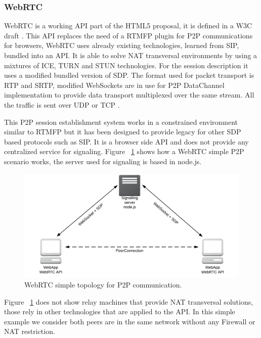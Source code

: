 \subsubsection{WebRTC}

WebRTC is a working API part of the HTML5 proposal, it is defined in a W3C draft \cite{webrtcW3cgroup}. This API replaces the need of a RTMFP plugin for P2P communications for browsers, WebRTC uses already existing technologies, learned from SIP, bundled into an API. It is able to solve NAT transversal environments by using a mixtures of ICE, TURN and STUN technologies. For the session description it uses a modified bundled version of SDP. The format used for packet transport is RTP and SRTP, modified WebSockets are in use for P2P DataChannel implementation to provide data transport multiplexed over the same stream. All the traffic is sent over UDP or TCP \cite{alvestrandOverview2012}.

This P2P session establishment system works in a constrained environment similar to RTMFP but it has been designed to provide legacy for other SDP based protocols such as SIP. It is a browser side API and does not provide any centralized service for signaling. Figure ~\ref{fig:webrtcExample} shows how a WebRTC simple P2P scenario works, the server used for signaling is based in node.js.

 \begin{figure}[h]
  \centering
    \includegraphics[width=1\textwidth]{./figures/webrtcExample.png}
      \caption[WebRTC simple topology for P2P communication]{WebRTC simple topology for P2P communication.}
	\label{fig:webrtcExample}
\end{figure}

Figure ~\ref{fig:webrtcExample} does not show relay machines that provide NAT transversal solutions, those rely in other technologies that are applied to the API. In this simple example we consider both peers are in the same network without any Firewall or NAT restriction.

